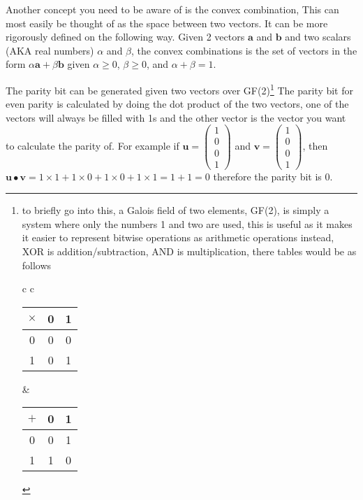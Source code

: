   Another concept you need to be aware of is the convex combination, This can most easily be thought of as the space between two vectors. It can be more rigorously defined on the following way. Given 2 vectors $\textbf{a}$ and $\textbf{b}$ and two scalars (AKA real numbers) $\alpha$ and $\beta$, the convex combinations is the set of vectors in the form $ \alpha\textbf{a} + \beta\textbf{b} $ given $\alpha \geq 0$, $\beta \geq 0$, and $\alpha + \beta = 1$.
  
  The parity bit can be generated given two vectors over GF(2)\footnote{to briefly go into this, a Galois field of two elements, GF(2), is simply a system where only the numbers 1 and two are used, this is useful as it makes it easier to represent bitwise operations as arithmetic operations instead, XOR is addition/subtraction, AND is multiplication, there tables would be as follows
  	\begin{table}[H]
  		\begin{tabular}{c c}
	  		\begin{tabular}{c | c | c}
	  			$\times$ & 0 & 1 \\\hline
	  			0 & 0 & 0 \\\hline
	  			1 & 0 & 1 \\
	  		\end{tabular}
	  		&
	  		\begin{tabular}{c | c | c}
	  			$+$ & 0 & 1 \\\hline
	  			0 & 0 & 1 \\\hline
	  			1 & 1 & 0 \\
	  		\end{tabular}
	  	\end{tabular}
  	\end{table}} The parity bit for even parity is calculated by doing the dot product of the two vectors, one of the vectors will always be filled with 1s and the other vector is the vector you want to calculate the parity of. For example if $\textbf{u} = \left( \begin{smallmatrix} 1 \\ 0 \\ 0 \\ 1 \end{smallmatrix}\right)$ and $\textbf{v} = \left( \begin{smallmatrix} 1 \\ 0 \\ 0 \\ 1 \end{smallmatrix}\right)$, then $\textbf{u}\bullet\textbf{v} = 1\times1 + 1\times0 + 1\times0 + 1\times1 = 1 + 1 = 0 $ therefore the parity bit is 0.